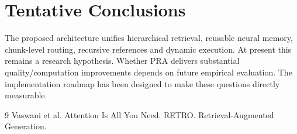 \documentclass[11pt]{article}
\begin{document}
\section{Tentative Conclusions}
The proposed architecture unifies hierarchical retrieval, reusable neural
memory, chunk-level routing, recursive references and dynamic execution.
At present this remains a research hypothesis. Whether PRA delivers substantial
quality/computation improvements depends on future empirical evaluation.
The implementation roadmap has been designed to make these questions directly
measurable.


\begin{thebibliography}{9}
 Vaswani et al. Attention Is All You Need.
 RETRO.
 Retrieval-Augmented Generation.
\end{thebibliography}
\end{document}
